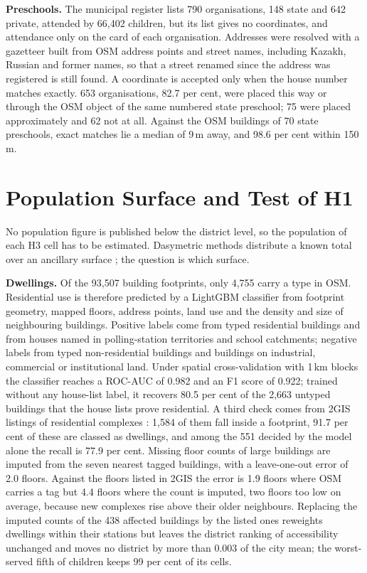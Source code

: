 \textbf{Preschools.} The municipal register lists 790 organisations, 148 state and 642 private, attended by 66,402 children, but its list gives no coordinates, and attendance only on the card of each organisation. Addresses were resolved with a gazetteer built from OSM address points and street names, including Kazakh, Russian and former names, so that a street renamed since the address was registered is still found. A coordinate is accepted only when the house number matches exactly. 653 organisations, 82.7 per cent, were placed this way or through the OSM object of the same numbered state preschool; 75 were placed approximately and 62 not at all. Against the OSM buildings of 70 state preschools, exact matches lie a median of 9\,m away, and 98.6 per cent within 150\,m.

\section{Population Surface and Test of H1}
\label{sec:population}

No population figure is published below the district level, so the population of each H3 cell has to be estimated. Dasymetric methods distribute a known total over an ancillary surface \cite{mennis2003}; the question is which surface.

\textbf{Dwellings.} Of the 93,507 building footprints, only 4,755 carry a type in OSM. Residential use is therefore predicted by a LightGBM classifier \cite{ke2017} from footprint geometry, mapped floors, address points, land use and the density and size of neighbouring buildings. Positive labels come from typed residential buildings and from houses named in polling-station territories and school catchments; negative labels from typed non-residential buildings and buildings on industrial, commercial or institutional land. Under spatial cross-validation with 1\,km blocks \cite{roberts2017} the classifier reaches a ROC-AUC of 0.982 and an F1 score of 0.922; trained without any house-list label, it recovers 80.5 per cent of the 2,663 untyped buildings that the house lists prove residential. A third check comes from 2GIS listings of residential complexes \cite{twogis2026}: 1,584 of them fall inside a footprint, 91.7 per cent of these are classed as dwellings, and among the 551 decided by the model alone the recall is 77.9 per cent. Missing floor counts of large buildings are imputed from the seven nearest tagged buildings, with a leave-one-out error of 2.0 floors. Against the floors listed in 2GIS the error is 1.9 floors where OSM carries a tag but 4.4 floors where the count is imputed, two floors too low on average, because new complexes rise above their older neighbours. Replacing the imputed counts of the 438 affected buildings by the listed ones reweights dwellings within their stations but leaves the district ranking of accessibility unchanged and moves no district by more than 0.003 of the city mean; the worst-served fifth of children keeps 99 per cent of its cells.

